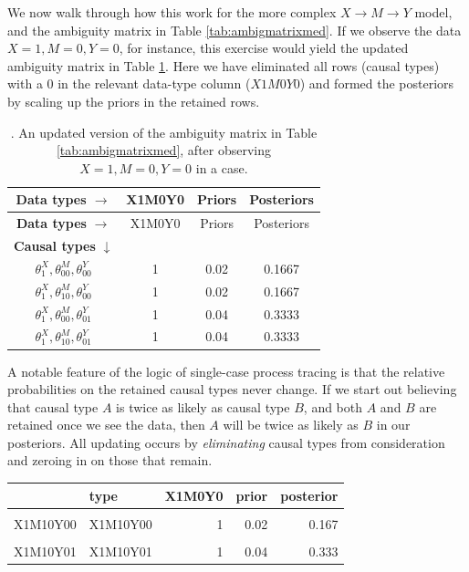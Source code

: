 \documentclass[
  12pt,
]{book}
\begin{document}
We now walk through how this work for the more complex \(X \rightarrow M \rightarrow Y\) model, and the ambiguity matrix in Table \ref{tab:ambigmatrixmed}. If we observe the data \(X=1, M=0, Y=0\), for instance, this exercise would yield the updated ambiguity matrix in Table \ref{tab:ambigmedupdate}. Here we have eliminated all rows (causal types) with a \(0\) in the relevant data-type column (\(X1M0Y0\)) and formed the posteriors by scaling up the priors in the retained rows.

\begin{longtable}[]{@{}cccc@{}}
\caption{\label{tab:ambigmedupdate}. An updated version of the ambiguity matrix in Table \ref{tab:ambigmatrixmed}, after observing \(X=1, M=0, Y=0\) in a case.}\tabularnewline
\toprule
\textbf{Data types} \(\rightarrow\) & X1M0Y0 & Priors & Posteriors \\
\midrule
\endfirsthead
\toprule
\textbf{Data types} \(\rightarrow\) & X1M0Y0 & Priors & Posteriors \\
\midrule
\endhead
\textbf{Causal types} \(\downarrow\) & & & \\
\(\theta^X_1,\theta^M_{00},\theta^Y_{00}\) & 1 & 0.02 & 0.1667 \\
\(\theta^X_1,\theta^M_{10},\theta^Y_{00}\) & 1 & 0.02 & 0.1667 \\
\(\theta^X_1,\theta^M_{00},\theta^Y_{01}\) & 1 & 0.04 & 0.3333 \\
\(\theta^X_1,\theta^M_{10},\theta^Y_{01}\) & 1 & 0.04 & 0.3333 \\
\bottomrule
\end{longtable}

A notable feature of the logic of single-case process tracing is that the relative probabilities on the retained causal types never change. If we start out believing that causal type \(A\) is twice as likely as causal type \(B\), and both \(A\) and \(B\) are retained once we see the data, then \(A\) will be twice as likely as \(B\) in our posteriors. All updating occurs by \emph{eliminating} causal types from consideration and zeroing in on those that remain.

\begin{table}
\centering
\begin{tabular}{llrrr}
\toprule
  & type & X1M0Y0 & prior & posterior\\
\midrule
\cellcolor{gray!6}{X1M00Y00} & \cellcolor{gray!6}{X1M00Y00} & \cellcolor{gray!6}{1} & \cellcolor{gray!6}{0.02} & \cellcolor{gray!6}{0.167}\\
X1M10Y00 & X1M10Y00 & 1 & 0.02 & 0.167\\
\cellcolor{gray!6}{X1M00Y01} & \cellcolor{gray!6}{X1M00Y01} & \cellcolor{gray!6}{1} & \cellcolor{gray!6}{0.04} & \cellcolor{gray!6}{0.333}\\
X1M10Y01 & X1M10Y01 & 1 & 0.04 & 0.333\\
\bottomrule
\end{tabular}
\end{table}
\end{document}
